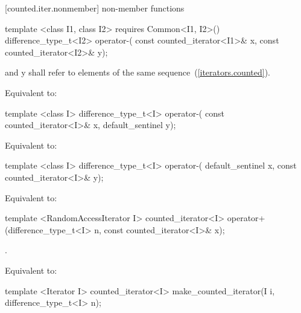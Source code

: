 [counted.iter.nonmember]{ non-member functions}

%
%
\begin{itemdecl}
  template <class I1, class I2>
      requires Common<I1, I2>()
  difference_type_t<I2> operator-(
    const counted_iterator<I1>& x, const counted_iterator<I2>& y);
\end{itemdecl}

\begin{itemdescr}
\pnum
\requires {} and {y} shall refer to
elements of the same sequence~(\ref{iterators.counted}).

\pnum
\effects Equivalent to:
\end{itemdescr}

\begin{itemdecl}
template <class I>
  difference_type_t<I> operator-(
    const counted_iterator<I>& x, default_sentinel y);
\end{itemdecl}

\begin{itemdescr}
\pnum
\effects Equivalent to:
\end{itemdescr}

\begin{itemdecl}
template <class I>
  difference_type_t<I> operator-(
    default_sentinel x, const counted_iterator<I>& y);
\end{itemdecl}

\begin{itemdescr}
\pnum
\effects Equivalent to:
\end{itemdescr}

%
%
\begin{itemdecl}
template <RandomAccessIterator I>
  counted_iterator<I>
    operator+(difference_type_t<I> n, const counted_iterator<I>& x);
\end{itemdecl}

\begin{itemdescr}
\pnum
\requires {}.

\pnum
\effects Equivalent to:
\end{itemdescr}

%
\begin{itemdecl}
template <Iterator I>
  counted_iterator<I> make_counted_iterator(I i, difference_type_t<I> n);
\end{itemdecl}

